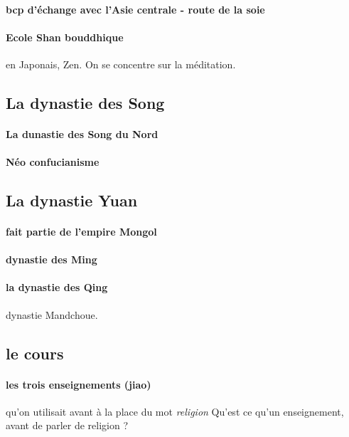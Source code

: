 \paragraph{bcp d'échange avec l'Asie centrale - route de la soie}

\paragraph{Ecole Shan bouddhique} en Japonais, Zen. On se concentre sur la méditation.


\subsection{La dynastie des Song}

\paragraph{La dunastie des Song du Nord}
 
\paragraph{Néo confucianisme}

\subsection{La dynastie Yuan}

\paragraph{fait partie de l'empire Mongol}


\paragraph{dynastie des Ming}

\paragraph{la dynastie des Qing} dynastie Mandchoue. 


\subsection{le cours}

\paragraph{les trois enseignements (jiao)} qu'on utilisait avant à la place du mot \textit{religion}
Qu'est ce qu'un enseignement, avant de parler de religion ?




